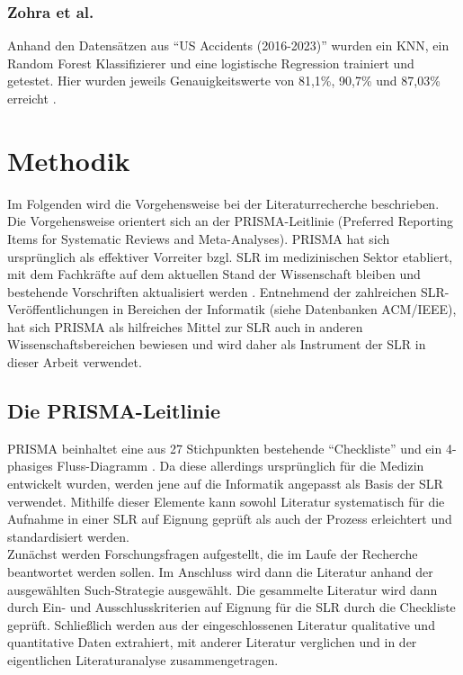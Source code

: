 \documentclass{scrartcl}
\begin{document}
\subsubsection{Zohra et al.}
Anhand den Datensätzen aus \enquote{US Accidents (2016-2023)} wurden ein KNN,
ein Random Forest Klassifizierer und eine logistische Regression trainiert und
getestet. Hier wurden jeweils Genauigkeitswerte von 81,1\%, 90,7\% und 87,03\%
erreicht \cite{akt3}.

\section{Methodik}
Im Folgenden wird die Vorgehensweise bei der Literaturrecherche beschrieben.
Die Vorgehensweise orientert sich an der PRISMA-Leitlinie (Preferred Reporting
Items for Systematic Reviews and Meta-Analyses). PRISMA hat sich ursprünglich
als effektiver Vorreiter bzgl. SLR im medizinischen Sektor etabliert, mit dem
Fachkräfte auf dem aktuellen Stand der Wissenschaft bleiben und bestehende
Vorschriften aktualisiert werden \cite{prisma}. Entnehmend der zahlreichen
SLR-Veröffentlichungen in Bereichen der Informatik (siehe Datenbanken ACM/IEEE),
hat sich PRISMA als hilfreiches Mittel zur SLR auch in anderen
Wissenschaftsbereichen bewiesen und wird daher als Instrument der SLR
in dieser Arbeit verwendet.

\subsection{Die PRISMA-Leitlinie}
PRISMA beinhaltet eine aus 27 Stichpunkten bestehende \enquote{Checkliste}
und ein 4-phasiges Fluss-Diagramm \cite{prisma}. Da diese allerdings ursprünglich
für die Medizin entwickelt wurden, werden jene auf die Informatik angepasst
als Basis der SLR verwendet.  Mithilfe dieser Elemente kann sowohl Literatur
systematisch für die Aufnahme in einer SLR auf Eignung geprüft als auch der
Prozess erleichtert und standardisiert werden.
\medskip \\
Zunächst werden Forschungsfragen aufgestellt, die im Laufe der Recherche beantwortet
werden sollen. Im Anschluss wird dann die Literatur anhand der ausgewählten
Such-Strategie ausgewählt. Die gesammelte Literatur wird dann durch Ein- und
Ausschlusskriterien auf Eignung für die SLR durch die Checkliste geprüft.
Schließlich werden aus der eingeschlossenen Literatur qualitative und quantitative
Daten extrahiert, mit anderer Literatur verglichen und in der eigentlichen
Literaturanalyse zusammengetragen.
\end{document}
